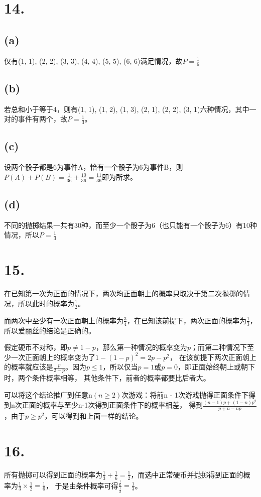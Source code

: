 \documentclass[UTF8]{report}
\begin{document}
    \section*{14.}
        \subsection*{(a)}
            仅有(1, 1), (2, 2), (3, 3), (4, 4), (5, 5), (6, 6)满足情况，故$P = \frac{1}{6}$
        \subsection*{(b)}
            若总和小于等于4，则有(1, 1), (1, 2), (1, 3), (2, 1), (2, 2), (3, 1)六种情况，其中一对的事件有两个，故$P = \frac{1}{3}$。
        \subsection*{(c)}
            设两个骰子都是6为事件A，恰有一个骰子为6为事件B，则$P(A) + P(B) = \frac{1}{36} + \frac{10}{36} = \frac{11}{36}$即为所求。
        \subsection*{(d)}
            不同的抛掷结果一共有30种，而至少一个骰子为6（也只能有一个骰子为6）有10种情况，所以$P = \frac{1}{3}$
    \section*{15.}
        在已知第一次为正面的情况下，两次均正面朝上的概率只取决于第二次抛掷的情况，所以此时的概率为$\frac{1}{2}$。

        而两次中至少有一次正面朝上的概率为$\frac{3}{4}$，在已知该前提下，两次正面的概率为$\frac{1}{3}$，所以爱丽丝的结论是正确的。

        假定硬币不对称，即$p \ne 1 - p$，那么第一种情况的概率变为$p$；而第二种情况下至少一次正面朝上的概率变为了$1 - (1 - p)^2 = 2p - p^2$，
        在该前提下两次正面朝上的概率就应该是$\frac{p}{2 - p}$。因为$p \leq 1$，所以仅当$p = 1$或$p = 0$，即正面始终朝上或朝下时，两个条件概率相等，
        其他条件下，前者的概率都要比后者大。

        可以将这个结论推广到任意n$(n \geq 2)$次游戏：将前n - 1次游戏抛得正面条件下得到n次正面的概率与至少n-1次得到正面条件下的概率相差，
        得到$\frac{(n - 1)p + (1 - n)p^2}{p + n - np}$，由于$p \geq p^2$，可以得到和上面一样的结论。
    \section*{16.}
        所有抛掷可以得到正面的概率为$\frac{1}{3} + \frac{1}{6} = \frac{1}{2}$，而选中正常硬币并抛掷得到正面的概率为$\frac{1}{3} \times \frac{1}{2} = \frac{1}{6}$，
        于是由条件概率可得$\frac{\frac{1}{6}}{\frac{1}{2}} = \frac{1}{3}$。
\end{document}
